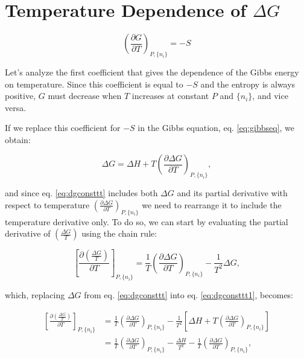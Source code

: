 \documentclass[
  9pt,
]{extbook}
\theoremstyle{definition}
\theoremstyle{definition}
\theoremstyle{definition}
\theoremstyle{remark}
\begin{document}
\hypertarget{temperature-dependence-of-delta-g}{%
\section{\texorpdfstring{Temperature Dependence of \(\Delta G\)}{Temperature Dependence of \textbackslash Delta G}}\label{temperature-dependence-of-delta-g}}

\[
\left(\frac{\partial G}{\partial T} \right)_{P,\{n_i\}}=-S
\]

Let's analyze the first coefficient that gives the dependence of the Gibbs energy on temperature. Since this coefficient is equal to \(-S\) and the entropy is always positive, \(G\) must decrease when \(T\) increases at constant \(P\) and \(\{n_i\}\), and vice versa.

If we replace this coefficient for \(-S\) in the Gibbs equation, eq. \eqref{eq:gibbseq}, we obtain:

\begin{equation}
\Delta G = \Delta H + T \left(\frac{\partial \Delta G}{\partial T} \right)_{P,\{n_i\}},
\label{eq:dgconsttt}
\end{equation}

and since eq. \eqref{eq:dgconsttt} includes both \(\Delta G\) and its partial derivative with respect to temperature \(\left(\frac{\partial \Delta G}{\partial T} \right)_{P,\{n_i\}}\) we need to rearrange it to include the temperature derivative only. To do so, we can start by evaluating the partial derivative of \(\left( \frac{\Delta G}{T} \right)\) using the chain rule:

\begin{equation}
\left[ \frac{\partial\left( \frac{\Delta G}{T} \right)}{\partial T} \right]_{P,\{n_i\}} = \frac{1}{T} \left(\frac{\partial \Delta G}{\partial T}  \right)_{P,\{n_i\}} - \frac{1}{T^2}\Delta G,
\label{eq:dgconsttt1}
\end{equation}

which, replacing \(\Delta G\) from eq. \eqref{eq:dgconsttt} into eq. \eqref{eq:dgconsttt1}, becomes:

\begin{equation}
\begin{aligned}
\left[ \frac{\partial\left( \frac{\Delta G}{T} \right)}{\partial T} \right]_{P,\{n_i\}} &= \frac{1}{T} \left(\frac{\partial \Delta G}{\partial T}  \right)_{P,\{n_i\}} - \frac{1}{T^2} \left[ \Delta H + T \left(\frac{\partial \Delta G}{\partial T} \right)_{P,\{n_i\}} \right] \\
&= \frac{1}{T} \left(\frac{\partial \Delta G}{\partial T}  \right)_{P,\{n_i\}}- \frac{\Delta H}{T^2}-\frac{1}{T} \left(\frac{\partial \Delta G}{\partial T}  \right)_{P,\{n_i\}},
\end{aligned}
\label{eq:dgconsttt2}
\end{equation}
\end{document}
